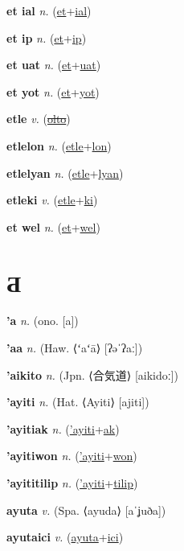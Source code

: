 \textbf{\hypertarget{et ial}{et ial}} \textit{n.} (\hyperlink{et}{et}+\allowbreak \hyperlink{ial}{ial})


\textbf{\hypertarget{et ip}{et ip}} \textit{n.} (\hyperlink{et}{et}+\allowbreak \hyperlink{ip}{ip})


\textbf{\hypertarget{et uat}{et uat}} \textit{n.} (\hyperlink{et}{et}+\allowbreak \hyperlink{uat}{uat})


\textbf{\hypertarget{et yot}{et yot}} \textit{n.} (\hyperlink{et}{et}+\allowbreak \hyperlink{yot}{yot})


\textbf{\hypertarget{etle}{etle}} \textit{v.} (\hyperlink{olto}{\sout{olto}})


\textbf{\hypertarget{etlelon}{etlelon}} \textit{n.} (\hyperlink{etle}{etle}+\allowbreak \hyperlink{lon}{lon})


\textbf{\hypertarget{etlelyan}{etlelyan}} \textit{n.} (\hyperlink{etle}{etle}+\allowbreak \hyperlink{lyan}{lyan})


\textbf{\hypertarget{etleki}{etleki}} \textit{v.} (\hyperlink{etle}{etle}+\allowbreak \hyperlink{ki}{ki})


\textbf{\hypertarget{et wel}{et wel}} \textit{n.} (\hyperlink{et}{et}+\allowbreak \hyperlink{wel}{wel})


\section{Ƌ}

\textbf{\hypertarget{'a}{'a}} \textit{n.} (ono. [a])


\textbf{\hypertarget{'aa}{'aa}} \textit{n.} (Haw. ⟨ʻaʻā⟩ [ʔəˈʔaː])


\textbf{\hypertarget{'aikito}{'aikito}} \textit{n.} (Jpn. ⟨{\japanese{}合気道}⟩ [aikidoː])


\textbf{\hypertarget{'ayiti}{'ayiti}} \textit{n.} (Hat. ⟨Ayiti⟩ [ajiti])


\textbf{\hypertarget{'ayitiak}{'ayitiak}} \textit{n.} (\hyperlink{'ayiti}{'ayiti}+\allowbreak \hyperlink{ak}{ak})


\textbf{\hypertarget{'ayitiwon}{'ayitiwon}} \textit{n.} (\hyperlink{'ayiti}{'ayiti}+\allowbreak \hyperlink{won}{won})


\textbf{\hypertarget{'ayititilip}{'ayititilip}} \textit{n.} (\hyperlink{'ayiti}{'ayiti}+\allowbreak \hyperlink{tilip}{tilip})


\textbf{\hypertarget{ayuta}{ayuta}} \textit{v.} (Spa. ⟨ayuda⟩ [aˈʝuða])


\textbf{\hypertarget{ayutaici}{ayutaici}} \textit{v.} (\hyperlink{ayuta}{ayuta}+\allowbreak \hyperlink{ici}{ici})


